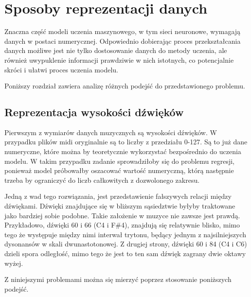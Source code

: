 \chapter{Sposoby reprezentacji danych}\label{chap:representation}
{
    Znaczna część modeli uczenia maszynowego, w tym sieci neuronowe, wymagają 
    danych w postaci numerycznej. Odpowiednio dobierając proces przekształcania danych
    możliwe jest nie tylko dostosowanie danych do metody uczenia, ale również
    uwypuklenie informacji prawdziwie w nich istotnych, co potencjalnie skróci i ułatwi proces uczenia modelu.

    Poniższy rozdział zawiera analizę różnych podejść do przedstawionego problemu.

    \section{Reprezentacja wysokości dźwięków}
    {
        Pierwszym z wymiarów danych muzycznych są wysokości dźwięków. W przypadku plików midi
        oryginalnie są to liczby z przedziału 0-127. Są to już dane numeryczne, które
        można by teoretycznie wykorzystać bezpośrednio do uczenia modelu.
        W takim przypadku zadanie sprowadziłoby się do problemu regresji, ponieważ model próbowałby
        oszacować wartość numeryczną, którą następnie trzeba by ograniczyć do liczb całkowitych z dozwolonego zakresu.

        Jedną z wad tego rozwiązania, jest przedstawienie fałszywych relacji między dźwiękami.
        Dźwięki znajdujące się w bliższym sąsiedztwie byłyby traktowane jako bardziej sobie podobne.
        Takie założenie w muzyce nie zawsze jest prawdą. Przykładowo, dźwięki 60 i 66 (C4 i F\#4), znajdują się
        relatywnie blisko, mimo tego że występuje między nimi interwał trytonu, będący jednym z najsilniejszych dysonansów w skali 
        dwunastotonowej. Z drugiej strony, dźwięki 60 i 84 (C4 i C6) dzieli spora odległość, mimo tego że jest to ten sam dźwięk
        zagrany dwie oktawy wyżej.

        Z niniejszymi problemami można się mierzyć poprzez stosowanie poniższych podejść.


}}
